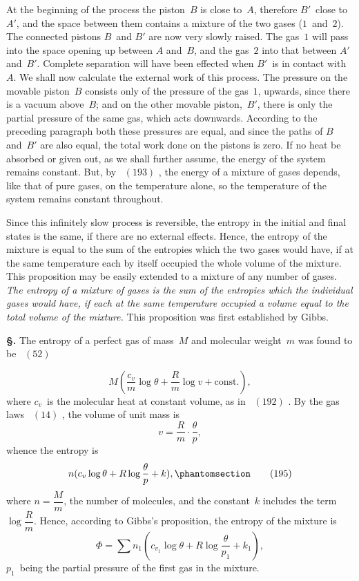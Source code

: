 \documentclass[12pt]{book}[2005/09/16]
\newcommand{\Section}[1]{
  \medskip\par\textbf{§\;#1}
  \label{section:#1}
}
\newcommand{\Tag}[1]{%
  \phantomsection\label{eqn:#1}\tag*{\ensuremath{#1}}%
}
\newcommand{\Eq}[1]{%
  \hyperref[eqn:#1]{\ensuremath{#1}}%
}
\newcommand{\PageSep}[1]{\ignorespaces}
\newcommand{\const}{\text{const.}}
\newcommand{\tsum}{\mathop{\textstyle\sum}\limits}
\begin{document}
At the beginning of the process the piston~$B$ is close to~$A$,
therefore $B'$~close to~$A'$, and the space between them
contains a mixture of the two gases ($1$~and~$2$). The connected
pistons $B$~and $B'$ are now very slowly raised. The
gas~$1$ will pass into the space opening up between $A$ and~$B$,
and the gas~$2$ into that between $A'$ and~$B'$. Complete
separation will have been effected when $B'$~is in contact with~$A$.
\PageSep{212}
We shall now calculate the external work of this process.
The pressure on the movable piston~$B$ consists only
of the pressure of the gas~$1$, upwards, since there is a vacuum
above~$B$; and on the other movable piston,~$B'$, there is only
the partial pressure of the same gas, which acts downwards.
According to the preceding paragraph both these pressures
are equal, and since the paths of $B$ and~$B'$ are also equal,
the total work done on the pistons is zero. If no heat be
absorbed or given out, as we shall further assume, the energy
of the system remains constant. But, by~\Eq{(193)}, the energy
of a mixture of gases depends, like that of pure gases, on
the temperature alone, so the temperature of the system
remains constant throughout.

Since this infinitely slow process is reversible, the
entropy in the initial and final states is the same, if there
are no external effects. Hence, the entropy of the mixture
is equal to the sum of the entropies which the two gases
would have, if at the same temperature each by itself occupied
the whole volume of the mixture. This proposition
may be easily extended to a mixture of any number of gases.
\emph{The entropy of a mixture of gases is the sum of the entropies
which the individual gases would have, if each at the same
temperature occupied a volume equal to the total volume of the
mixture.} This proposition was first established by Gibbs.
%

\Section{237.} The entropy of a perfect gas of mass~$M$ and molecular
weight~$m$ was found to be~\Eq{(52)}
\[
M \left(\frac{c_{v}}{m} \log \theta + \frac{R}{m} \log v + \const\right),
\]
where $c_{v}$~is the molecular heat at constant volume, as in~\Eq{(192)}.
By the gas laws~\Eq{(14)}, the volume of unit mass is
\[
v = \frac{R}{m} · \frac{\theta}{p},
\]
whence the entropy is
\[
n (c_{v} \log \theta + R \log \frac{\theta}{p} + k),
\Tag{(195)}
\]
\PageSep{213}
where $n = \dfrac{M}{m}$, the number of molecules, and the constant~$k$
includes the term $\log \dfrac{R}{m}$. Hence, according to Gibbs's proposition,
the entropy of the mixture is
\[
\Phi = \tsum n_{1} (c_{v_{1}} \log \theta + R \log \frac{\theta}{p_{1}} + k_{1}),
\]
$p_{1}$~being the partial pressure of the first gas in the mixture.
\end{document}
